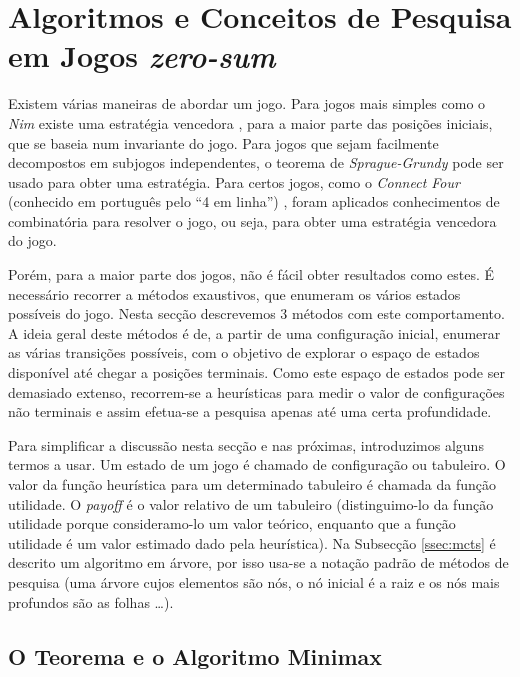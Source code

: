 \documentclass[12pt,a4paper,oneside]{article}
\begin{document}

\section{Algoritmos e Conceitos de Pesquisa em Jogos \textit{zero-sum}}
\label{sec:algconc}

Existem várias maneiras de abordar um jogo. Para jogos mais simples
como o \textit{Nim} existe uma estratégia vencedora
\cite{Bouton:1901}, para a maior parte das posições iniciais, que se
baseia num invariante do jogo. Para jogos que sejam facilmente
decompostos em subjogos independentes, o teorema de
\textit{Sprague-Grundy} pode ser usado para obter uma estratégia. Para
certos jogos, como o \textit{Connect Four} (conhecido em português
pelo ``4 em linha'') \cite{Allis:1988}, foram aplicados conhecimentos
de combinatória para resolver o jogo, ou seja, para obter uma
estratégia vencedora do jogo.

Porém, para a maior parte dos jogos, não é fácil obter resultados como
estes. É necessário recorrer a métodos exaustivos, que enumeram os
vários estados possíveis do jogo. Nesta secção descrevemos 3 métodos
com este comportamento. A ideia geral deste métodos é de, a partir de
uma configuração inicial, enumerar as várias transições possíveis, com
o objetivo de explorar o espaço de estados disponível até chegar a
posições terminais. Como este espaço de estados pode ser demasiado
extenso, recorrem-se a heurísticas para medir o valor de configurações
não terminais e assim efetua-se a pesquisa apenas até uma certa
profundidade.

Para simplificar a discussão nesta secção e nas próximas, introduzimos
alguns termos a usar. Um estado de um jogo é chamado de configuração
ou tabuleiro. O valor da função heurística para um determinado
tabuleiro é chamada da função utilidade. O \textit{payoff} é o valor
relativo de um tabuleiro (distinguimo-lo da função utilidade porque
consideramo-lo um valor teórico, enquanto que a função utilidade é um
valor estimado dado pela heurística). Na Subsecção \ref{ssec:mcts} é
descrito um algoritmo em árvore, por isso usa-se a notação padrão de
métodos de pesquisa (uma árvore cujos elementos são nós, o nó inicial
é a raiz e os nós mais profundos são as folhas \ldots).

\subsection{O Teorema e o Algoritmo Minimax}
\end{document}
